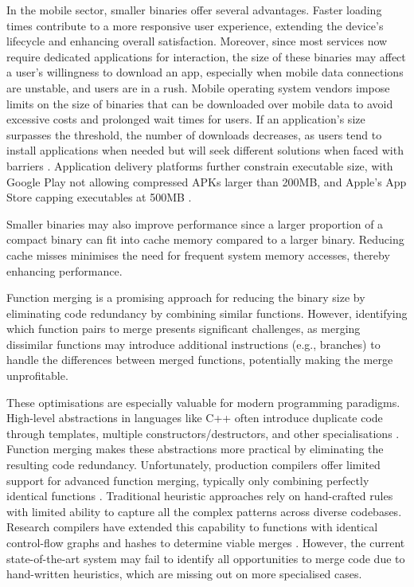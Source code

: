 In the mobile sector, smaller binaries offer several advantages. Faster loading times contribute to a more responsive user experience, extending the device's lifecycle and enhancing overall satisfaction. Moreover, since most services now require dedicated applications for interaction, the size of these binaries may affect a user's willingness to download an app, especially when mobile data connections are unstable, and users are in a rush. Mobile operating system vendors impose limits on the size of binaries that can be downloaded over mobile data to avoid excessive costs and prolonged wait times for users. If an application's size surpasses the threshold, the number of downloads decreases, as users tend to install applications when needed but will seek different solutions when faced with barriers \cite{UberBinarySize}. Application delivery platforms further constrain executable size, with Google Play not allowing compressed APKs larger than 200MB, and Apple's App Store capping executables at 500MB \cite{GoogleBuildSize}\cite{AppleBuildSize}.

Smaller binaries may also improve performance since a larger proportion of a compact binary can fit into cache memory compared to a larger binary. Reducing cache misses minimises the need for frequent system memory accesses, thereby enhancing performance.

Function merging is a promising approach for reducing the binary size by eliminating code redundancy by combining similar functions. However, identifying which function pairs to merge presents significant challenges, as merging dissimilar functions may introduce additional instructions (e.g., branches) to handle the differences between merged functions, potentially making the merge unprofitable.

These optimisations are especially valuable for modern programming paradigms. High-level abstractions in languages like C++ often introduce duplicate code through templates, multiple constructors/destructors, and other specialisations \cite{CPPTemplateCodeDuplication}. Function merging makes these abstractions more practical by eliminating the resulting code redundancy. Unfortunately, production compilers offer limited support for advanced function merging, typically only combining perfectly identical functions \cite{LLVMMergeFunctionsPass}. Traditional heuristic approaches rely on hand-crafted rules with limited ability to capture all the complex patterns across diverse codebases. Research compilers have extended this capability to functions with identical control-flow graphs  and hashes to determine viable merges \cite{FunctionMergingIsomorphicCFG}\cite{F3M:FastFocusedFunctionMerging}. However, the current state-of-the-art system may fail to identify all opportunities to merge code due to hand-written heuristics, which are missing out on more specialised cases. 

